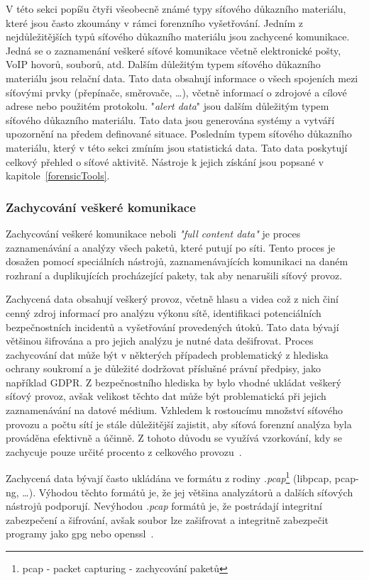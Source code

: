         V této sekci popíšu čtyři všeobecně známé typy síťového důkazního materiálu, které jsou často zkoumány v rámci forenzního vyšetřování. Jedním z nejdůležitějších typů síťového důkazního materiálu jsou zachycené komunikace. Jedná se o zaznamenání veškeré síťové komunikace včetně elektronické pošty, VoIP hovorů, souborů, atd. Dalším důležitým typem síťového důkazního materiálu jsou relační data. Tato data obsahují informace o všech spojeních mezi síťovými prvky (přepínače, směrovače, …), včetně informací o zdrojové a cílové adrese nebo použitém protokolu. "\textit{alert data}" jsou dalším důležitým typem síťového důkazního materiálu. Tato data jsou generována systémy a vytváří upozornění na předem definované situace. Posledním typem síťového důkazního materiálu, který v této sekci zmíním jsou statistická data. Tato data poskytují celkový přehled o síťové aktivitě. Nástroje k jejich získání jsou popsané v kapitole~\ref{forensicTools}.
    
    \subsubsection*{Zachycování veškeré komunikace}
    Zachycování veškeré komunikace neboli \textit{"full content data"} je proces zaznamenávání a analýzy všech paketů, které putují po síti. Tento proces je dosažen pomocí speciálních nástrojů, zaznamenávajících komunikaci na daném rozhraní a duplikujících procházející pakety, tak aby nenarušili síťový provoz.

    Zachycená data obsahují veškerý provoz, včetně hlasu a videa což z nich činí cenný zdroj informací pro analýzu výkonu sítě, identifikaci potenciálních bezpečnostních incidentů a vyšetřování provedených útoků. Tato data bývají většinou šifrována a pro jejich analýzu je nutné data dešifrovat. Proces zachycování dat může být v některých případech problematický z hlediska ochrany soukromí a je důležité dodržovat příslušné právní předpisy, jako například GDPR. \newline Z bezpečnostního hlediska by bylo vhodné ukládat veškerý síťový provoz, avšak velikost těchto dat může být problematická při jejich zaznamenávání na datové médium. Vzhledem k rostoucímu množství síťového provozu a počtu sítí je stále důležitější zajistit, aby síťová forenzní analýza byla prováděna efektivně a účinně. Z tohoto důvodu se využívá vzorkování, kdy se zachycuje pouze určité procento z celkového provozu~\cite{FundamentalsOfNetworkForensicsReference}. 
    
    
    Zachycená data bývají často ukládána ve formátu z rodiny \textit{.pcap}\footnote{pcap - packet capturing - zachycování paketů} (libpcap, pcap-ng, …). Výhodou těchto formátů je, že jej většina analyzátorů a dalších síťových nástrojů podporují. Nevýhodou \textit{.pcap} formátů je, že postrádají integritní zabezpečení a šifrování, avšak soubor lze zašifrovat a integritně zabezpečit programy jako gpg nebo openssl~\cite{EnisaReference}.

